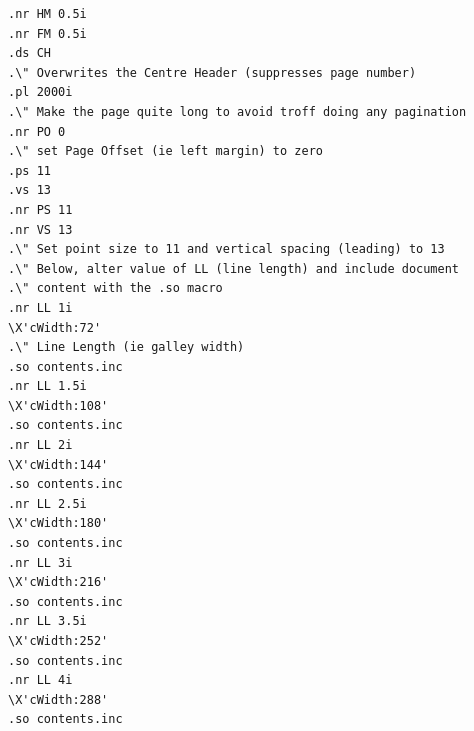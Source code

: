 \begin{lstlisting}[label=lst:troffsourcedoc1,captionpos=b,float,basicstyle=\ttfamily\footnotesize,caption={[A sample troff source document, part 1]A sample troff source document. The actual document text is in a file named {\tt contents.inc} , and is imported multiple times with the {\tt .so} macro. After each import, the current line length is changed (using, for example, {\tt .nr LL 1.5i} to set the Line Length register to 1.5 inches). The {\tt \textbackslash X} commands are used to pass arbitrary data through the typesetter, and into the resultant ditroff intermediate code for later use. In this case, it is used to pass the column width (hence ``cWidth'') in points, so that this data can later be embedded within the final \pdf{} file.}]
.nr HM 0.5i
.nr FM 0.5i
.ds CH 
.\" Overwrites the Centre Header (suppresses page number)
.pl 2000i
.\" Make the page quite long to avoid troff doing any pagination
.nr PO 0
.\" set Page Offset (ie left margin) to zero
.ps 11
.vs 13
.nr PS 11
.nr VS 13
.\" Set point size to 11 and vertical spacing (leading) to 13
.\" Below, alter value of LL (line length) and include document
.\" content with the .so macro
.nr LL 1i
\X'cWidth:72'
.\" Line Length (ie galley width)
.so contents.inc
.nr LL 1.5i
\X'cWidth:108'
.so contents.inc
.nr LL 2i
\X'cWidth:144'
.so contents.inc
.nr LL 2.5i
\X'cWidth:180'
.so contents.inc
.nr LL 3i
\X'cWidth:216'
.so contents.inc
.nr LL 3.5i
\X'cWidth:252'
.so contents.inc
.nr LL 4i
\X'cWidth:288'
.so contents.inc
\end{lstlisting}


